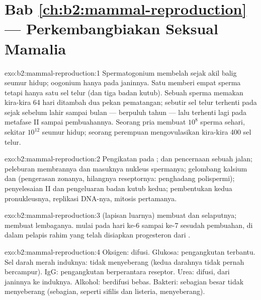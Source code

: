 \section*{Bab \ref{ch:b2:mammal-reproduction} --- Perkembangbiakan Seksual Mamalia}

\begin{solution}{exo:b2:mammal-reproduction:1}
Spermatogonium membelah sejak akil balig seumur hidup; oogonium hanya
pada janinnya. Satu  memberi empat sperma tetapi hanya satu sel
telur (dan tiga badan kutub). Sebuah sperma memakan kira-kira 64 hari
ditambah dua pekan pematangan; sebutir sel telur terhenti pada  sejak sebelum lahir sampai bulan  --- berpuluh tahun ---
lalu terhenti lagi pada metafase II sampai pembuahannya. Seorang pria
membuat $10^{8}$ sperma sehari, sekitar $10^{12}$ seumur hidup; seorang
perempuan mengovulasikan kira-kira 400 sel telur.
\end{solution}

\begin{solution}{exo:b2:mammal-reproduction:2}
Pengikatan pada ;  dan pencernaan sebuah
jalan; peleburan membrannya dan masuknya nukleus spermanya; gelombang
kalsium dan  (pengerasan zonanya, hilangnya reseptornya:
penghadang polispermi); penyelesaian  II dan pengeluaran badan
kutub kedua; pembentukan kedua pronukleusnya, replikasi DNA-nya,
mitosis pertamanya.
\end{solution}

\begin{solution}{exo:b2:mammal-reproduction:3}
 (lapisan luarnya) membuat  dan selaputnya;  membuat lembaganya.  mulai pada hari ke-6 sampai
ke-7 sesudah pembuahan, di dalam pelapis rahim yang telah disiapkan
progesteron dari .
\end{solution}

\begin{solution}{exo:b2:mammal-reproduction:4}
Oksigen: difusi. Glukosa: pengangkutan terbantu. Sel darah merah
induknya: tidak menyeberang (kedua darahnya tidak pernah bercampur).
IgG: pengangkutan berperantara reseptor. Urea: difusi, dari janinnya ke
induknya. Alkohol: berdifusi bebas. Bakteri: sebagian besar tidak
menyeberang (sebagian, seperti sifilis dan listeria, menyeberang).
\end{solution}

